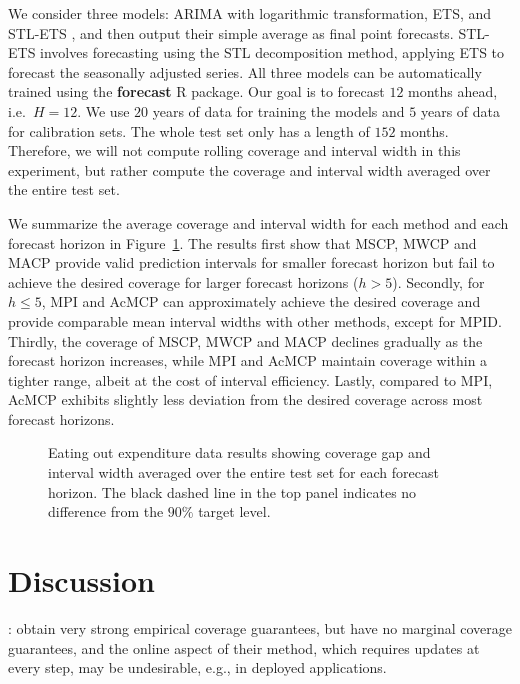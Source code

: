 \documentclass[
  11pt,
  a4paper,
]{article}
\theoremstyle{plain}
\theoremstyle{remark}
\begin{document}
We consider three models: ARIMA with logarithmic transformation, ETS,
and STL-ETS \autocite{hyndman2021}, and then output their simple average
as final point forecasts. STL-ETS involves forecasting using the STL
decomposition method, applying ETS to forecast the seasonally adjusted
series. All three models can be automatically trained using the
\textbf{forecast} R package. Our goal is to forecast \(12\) months
ahead, i.e.~\(H=12\). We use \(20\) years of data for training the
models and \(5\) years of data for calibration sets. The whole test set
only has a length of \(152\) months. Therefore, we will not compute
rolling coverage and interval width in this experiment, but rather
compute the coverage and interval width averaged over the entire test
set.

We summarize the average coverage and interval width for each method and
each forecast horizon in Figure~\ref{fig-cafe_cov}. The results first
show that MSCP, MWCP and MACP provide valid prediction intervals for
smaller forecast horizon but fail to achieve the desired coverage for
larger forecast horizons (\(h>5\)). Secondly, for \(h \leq 5\), MPI and
AcMCP can approximately achieve the desired coverage and provide
comparable mean interval widths with other methods, except for MPID.
Thirdly, the coverage of MSCP, MWCP and MACP declines gradually as the
forecast horizon increases, while MPI and AcMCP maintain coverage within
a tighter range, albeit at the cost of interval efficiency. Lastly,
compared to MPI, AcMCP exhibits slightly less deviation from the desired
coverage across most forecast horizons.

\begin{figure}


\caption{\label{fig-cafe_cov}Eating out expenditure data results showing
coverage gap and interval width averaged over the entire test set for
each forecast horizon. The black dashed line in the top panel indicates
no difference from the \(90\%\) target level.}

\end{figure}%

\section{Discussion}\label{discussion}

\textcite{oliveira2024}: obtain very strong empirical coverage
guarantees, but have no marginal coverage guarantees, and the online
aspect of their method, which requires updates at every step, may be
undesirable, e.g., in deployed applications.
\end{document}
